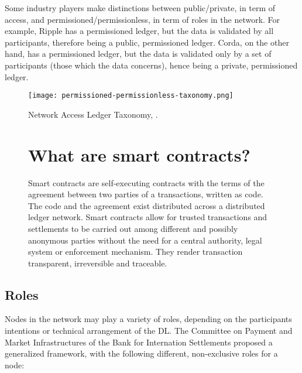 Some industry players make distinctions between public/private, in term of access, and permissioned/permissionless, in term of roles in the network. For example, Ripple has a permissioned ledger, but the data is validated by all participants, therefore being a public, permissioned ledger. Corda, on the other hand, has a permissioned ledger, but the data is validated only by a set of participants (those which the data concerns), hence being a private, permissioned ledger.

\begin{figure}[h]
    \centering
    \texttt{[image: permissioned-permissionless-taxonomy.png]}
    \caption{
        Network Access Ledger Taxonomy, \cite{ukgovdltpaper}. 
        }
\end{figure}

\begin{figure}[b]
    \begin{tcolorbox}[colframe=boxcolor]
        \section*{What are smart contracts?}
            Smart contracts are self-executing contracts with the terms of the agreement between two parties of a transactions, written as code. The code and the agreement exist distributed across a distributed ledger network. Smart contracts allow for trusted transactions and settlements to be carried out among different and possibly anonymous parties without the need for a central authority, legal system or enforcement mechanism. They render transaction transparent, irreversible and traceable. 
    \end{tcolorbox}
\end{figure}

\subsection{Roles}
Nodes in the network may play a variety of roles, depending on the participants intentions or technical arrangement of the DL. The Committee on Payment and Market Infrastructures of the Bank for Internation Settlements proposed a generalized framework, with the following different, non-exclusive roles for a node:

